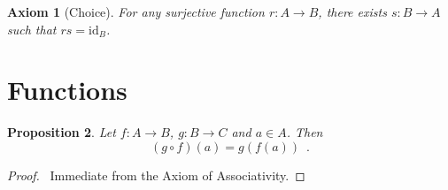 \documentclass{book}
\let\qed\relax
\newtheorem{ax}{Axiom}[chapter]
\newtheorem{prop}[ax]{Proposition}
\theoremstyle{definition}
\newcommand{\id}[1]{\ensuremath{\mathrm{id}_{#1}}}
\begin{document}
\begin{ax}[Choice]
For any surjective function $r : A \rightarrow B$, there exists $s : B \rightarrow A$ such that $rs = \id{B}$.
\end{ax}

\section{Functions}

\begin{prop}
Let $f : A \rightarrow B$, $g : B \rightarrow C$ and $a \in A$. Then
\[ (g \circ f)(a) = g(f(a)) \enspace . \]
\end{prop}

\begin{proof}
\pf\ Immediate from the Axiom of Associativity. \qed
\end{proof}
\end{document}
